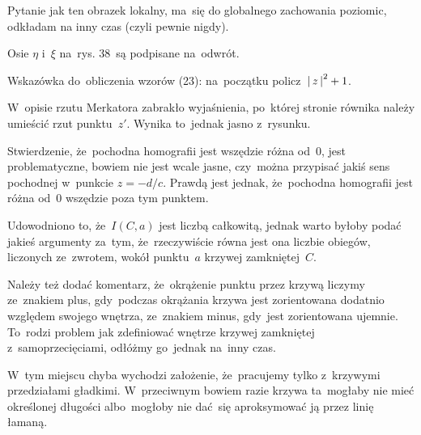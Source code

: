 \documentclass[a4paper,11pt]{article}
\begin{document}

Pytanie jak ten obrazek lokalny, ma~się do globalnego zachowania
poziomic, odkładam na inny czas (czyli pewnie nigdy).

\vspace{\spaceFour}


\start {} Osie $\eta$ i~$\xi$ na~rys. 38~są podpisane na~odwrót.

\vspace{\spaceFour}


\start {} Wskazówka do~obliczenia wzorów (23): na~początku
policz~$\left| \,  z  \, \right|^{ 2 } + 1$.

\vspace{\spaceFour}


\start {} W~opisie rzutu Merkatora zabrakło wyjaśnienia,
po~której stronie równika należy umieścić rzut punktu~$z'$. Wynika
to~jednak jasno z~rysunku.

\vspace{\spaceFour}


\start {} Stwierdzenie, że~pochodna homografii jest wszędzie
różna od~0, jest problematyczne, bowiem nie jest wcale jasne,
czy~można przypisać jakiś sens pochodnej w~punkcie $z = -d / c$.
Prawdą jest jednak, że~pochodna homografii jest różna od~0 wszędzie
poza tym punktem.

\vspace{\spaceFour}


\start {} Udowodniono to, że~$I( C, a )$ jest liczbą
całkowitą, jednak warto byłoby podać jakieś argumenty za~tym,
że~rzeczywiście równa jest ona liczbie obiegów, liczonych ze~zwrotem,
wokół punktu~$a$ krzywej zamkniętej~$C$.

Należy też dodać komentarz, że~okrążenie punktu przez krzywą liczymy
ze~znakiem plus, gdy~podczas okrążania krzywa jest zorientowana
dodatnio względem swojego wnętrza, ze~znakiem minus, gdy~jest
zorientowana ujemnie. To~rodzi problem jak zdefiniować wnętrze krzywej
zamkniętej z~samoprzecięciami, odłóżmy go~jednak na~inny czas.

\vspace{\spaceFour}


\start {} W~tym miejscu chyba wychodzi założenie, że~pracujemy
tylko z~krzywymi przedziałami gładkimi. W~przeciwnym bowiem razie
krzywa ta~mogłaby nie mieć określonej długości albo~mogłoby nie
dać~się aproksymować ją przez linię łamaną.
\end{document}
